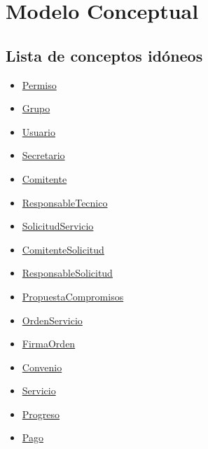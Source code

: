 \section{Modelo Conceptual}
\subsection[Conceptos id\'oneos]
	{Lista de conceptos id\'oneos}
\begin{itemize}
	\item \hyperlink{permiso}{Permiso}
	\item \hyperlink{grupo}{Grupo}
	\item \hyperlink{usuario}{Usuario}
	\item \hyperlink{secretario}{Secretario}
	\item \hyperlink{comitente}{Comitente}
	\item \hyperlink{responsabletecnico}{ResponsableTecnico}
	\item \hyperlink{solicitudservicio}{SolicitudServicio}
	\item \hyperlink{comitentesolicitud}{ComitenteSolicitud}
	\item \hyperlink{responsablesolicitud}{ResponsableSolicitud}
	\item \hyperlink{propuestacompromisos}{PropuestaCompromisos}
	\item \hyperlink{ordenservicio}{OrdenServicio}
	\item \hyperlink{firmaorden}{FirmaOrden}
	\item \hyperlink{convenio}{Convenio}
	\item \hyperlink{servicio}{Servicio}
	\item \hyperlink{progreso}{Progreso}
	\item \hyperlink{pago}{Pago}
\end{itemize}
